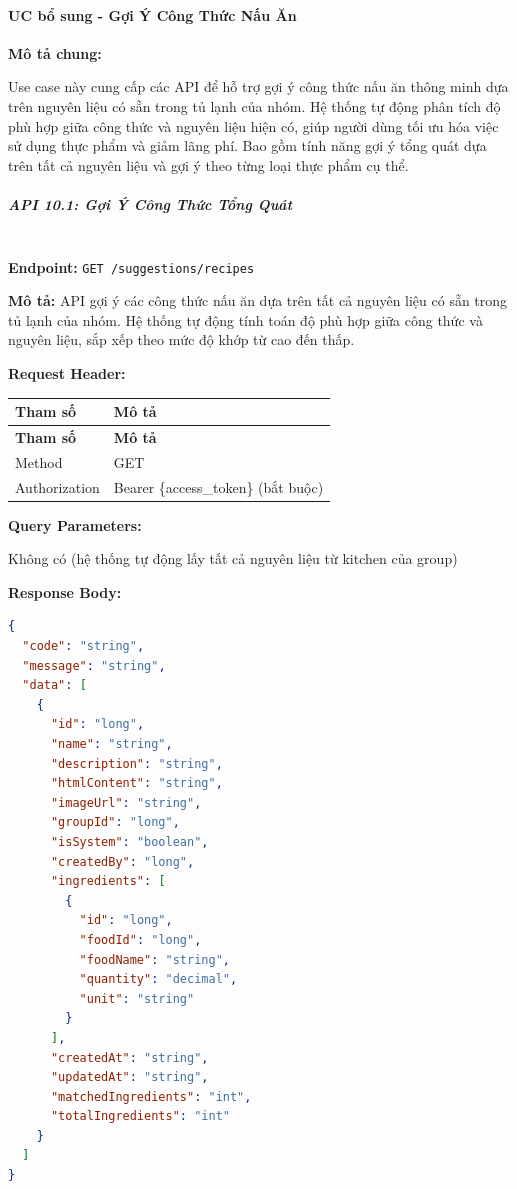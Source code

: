 \paragraph{UC bổ sung - Gợi Ý Công Thức Nấu Ăn}

\textbf{Mô tả chung:}

Use case này cung cấp các API để hỗ trợ gợi ý công thức nấu ăn thông minh dựa trên nguyên liệu có sẵn trong tủ lạnh của nhóm. Hệ thống tự động phân tích độ phù hợp giữa công thức và nguyên liệu hiện có, giúp người dùng tối ưu hóa việc sử dụng thực phẩm và giảm lãng phí. Bao gồm tính năng gợi ý tổng quát dựa trên tất cả nguyên liệu và gợi ý theo từng loại thực phẩm cụ thể.

\subparagraph{API 10.1: Gợi Ý Công Thức Tổng Quát}~\\

\textbf{Endpoint:} \texttt{GET /suggestions/recipes}

\textbf{Mô tả:} API gợi ý các công thức nấu ăn dựa trên tất cả nguyên liệu có sẵn trong tủ lạnh của nhóm. Hệ thống tự động tính toán độ phù hợp giữa công thức và nguyên liệu, sắp xếp theo mức độ khớp từ cao đến thấp.

\textbf{Request Header:}

\begin{longtable}{|p{}|p{}|}
\hline
\textbf{Tham số} & \textbf{Mô tả} \\
\hline
\endfirsthead

\hline
\textbf{Tham số} & \textbf{Mô tả} \\
\hline
\endhead

\hline
\endfoot

Method & GET \\
\hline
Authorization & Bearer \{access\_token\} (bắt buộc) \\
\hline
\end{longtable}

\textbf{Query Parameters:}

Không có (hệ thống tự động lấy tất cả nguyên liệu từ kitchen của group)

\textbf{Response Body:}

\begin{lstlisting}[language=json]
{
  "code": "string",
  "message": "string",
  "data": [
    {
      "id": "long",
      "name": "string",
      "description": "string",
      "htmlContent": "string",
      "imageUrl": "string",
      "groupId": "long",
      "isSystem": "boolean",
      "createdBy": "long",
      "ingredients": [
        {
          "id": "long",
          "foodId": "long",
          "foodName": "string",
          "quantity": "decimal",
          "unit": "string"
        }
      ],
      "createdAt": "string",
      "updatedAt": "string",
      "matchedIngredients": "int",
      "totalIngredients": "int"
    }
  ]
}
\end{lstlisting}

